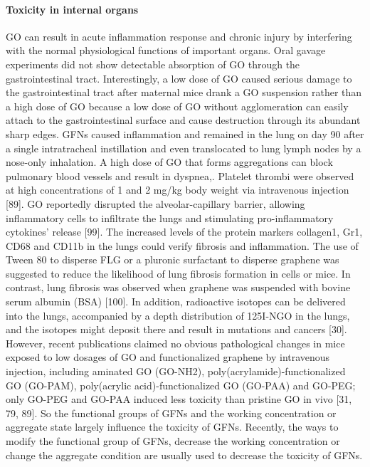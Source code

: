 \documentclass[twoside,twocolumn,9pt]{article}
\begin{document}
\paragraph{Toxicity in internal organs}
GO can result in acute inflammation response and chronic injury by interfering with the normal physiological functions of important organs. Oral gavage experiments did not show detectable absorption of GO through the gastrointestinal tract. Interestingly, a low dose of GO caused serious damage to the gastrointestinal tract after maternal mice drank a GO suspension rather than a high dose of GO because a low dose of GO without agglomeration can easily attach to the gastrointestinal surface and cause destruction through its abundant sharp edges. GFNs caused inflammation and remained in the lung on day 90 after a single intratracheal instillation and even translocated to lung lymph nodes by a nose-only inhalation. A high dose of GO that forms aggregations can block pulmonary blood vessels and result in dyspnea,. Platelet thrombi were observed at high concentrations of 1 and 2 mg/kg body weight via intravenous injection [89]. GO reportedly disrupted the alveolar-capillary barrier, allowing inflammatory cells to infiltrate the lungs and stimulating pro-inflammatory cytokines' release [99]. The increased levels of the protein markers collagen1, Gr1, CD68 and CD11b in the lungs could verify fibrosis and inflammation. The use of Tween 80 to disperse FLG or a pluronic surfactant to disperse graphene was suggested to reduce the likelihood of lung fibrosis formation in cells or mice. In contrast, lung fibrosis was observed when graphene was suspended with bovine serum albumin (BSA) [100]. In addition, radioactive isotopes can be delivered into the lungs, accompanied by a depth distribution of 125I-NGO in the lungs, and the isotopes might deposit there and result in mutations and cancers [30]. However, recent publications claimed no obvious pathological changes in mice exposed to low dosages of GO and functionalized graphene by intravenous injection, including aminated GO (GO-NH2), poly(acrylamide)-functionalized GO (GO-PAM), poly(acrylic acid)-functionalized GO (GO-PAA) and GO-PEG; only GO-PEG and GO-PAA induced less toxicity than pristine GO in vivo [31, 79, 89]. So the functional groups of GFNs and the working concentration or aggregate state largely influence the toxicity of GFNs. Recently, the ways to modify the functional group of GFNs, decrease the working concentration or change the aggregate condition are usually used to decrease the toxicity of GFNs.
\end{document}
